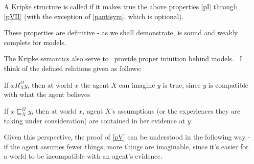 \begin{definition}
A Kripke structure is called  if it makes true the
  above properties \ref{pI} through \ref{pVII} (with the exception of \ref{pantisym}, which is optional).
\end{definition}

These properties are definitive - as we shall demonstrate,  is
sound and weakly complete for  models.

The Kripke semantics also serve to \ provide proper intuition behind
 models. \ I think of the defined relations given as follows:
\begin{itemizedot}
  \item If $x R^{\Omega}_X y$, then at world $x$ the agent $X$ can imagine $y$
  is true, since $y$ is compatible with what the agent believes 
  \item If $x \sqsubseteq^{\Omega}_X y$, then at world $x$, agent $X$'s
  assumptions (or the experiences they are taking under consideration) are
  contained in her evidence at $y$
\end{itemizedot}
Given this perspective, the proof of \ref{pV} can be understood in the
following way - if the agent assumes fewer things, more things are imaginable,
since it's easier for a world to be incompatible with an agent's evidence.

